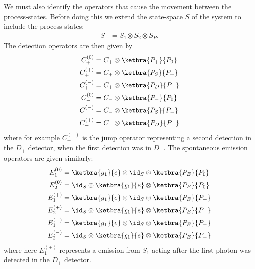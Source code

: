 We must also identify the operators that cause the movement between the process-states. Before doing this we extend the state-space $S$ of the system to include the process-states:
\begin{eqnarray}
  S   &= S_1 \otimes S_2 \otimes S_P.
\end{eqnarray}
The detection operators are then given by
\begin{eqnarray}
  C_{+}^{(0)}  & = C_{+} \otimes \ketbra{P_+}{P_0}\\
  C_{+}^{(+)} & = C_{+} \otimes \ketbra{P_S}{P_+}\\
  C_{+}^{(-)} & = C_{+} \otimes \ketbra{P_D}{P_-}\\
  C_{-}^{(0)}  & = C_{-} \otimes \ketbra{P_-}{P_0}\\
  C_{-}^{(-)} & = C_{-} \otimes \ketbra{P_S}{P_-}\\
  C_{-}^{(+)} & = C_{-} \otimes \ketbra{P_D}{P_+}
\end{eqnarray}
where for example $C_{+}^{(-)}$ is the jump operator representing a second detection in the $D_+$ detector, when the first detection was in $D_-$. The spontaneous emission operators are given similarly:
\begin{eqnarray}
  E_1^{(0)} &= \ketbra{g_1}{e} \otimes \id_S   \otimes \ketbra{P_E}{P_0}\\
  E_2^{(0)} &=  \id_S  \otimes \ketbra{g_1}{e} \otimes \ketbra{P_E}{P_0}\\
  E_1^{(+)} &= \ketbra{g_1}{e} \otimes \id_S   \otimes \ketbra{P_E}{P_+}\\
  E_2^{(+)} &=  \id_S  \otimes \ketbra{g_1}{e} \otimes \ketbra{P_E}{P_+}\\
  E_1^{(-)} &= \ketbra{g_1}{e} \otimes \id_S   \otimes \ketbra{P_E}{P_-}\\
  E_2^{(-)} &=  \id_S  \otimes \ketbra{g_1}{e} \otimes \ketbra{P_E}{P_-}
\end{eqnarray}
where here $E_1^{(+)}$ represents a emission from $S_1$ acting after the first photon was detected in the $D_+$ detector.

